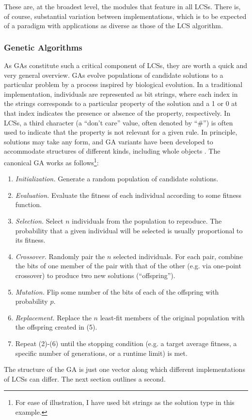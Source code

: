 \documentclass[11pt]{article}
\begin{document}
These are, at the broadest level, the modules that feature in all LCSs. There is, of course, substantial variation between implementations, which is to be expected of a paradigm with applications as diverse as those of the LCS algorithm.

\subsubsection{Genetic Algorithms}

As GAs constitute such a critical component of LCSs, they are worth a quick and very general overview. GAs evolve populations of candidate solutions to a particular problem by a process inspired by biological evolution. In a traditional implementation, individuals are represented as bit strings, where each index in the strings corresponds to a particular property of the solution and a 1 or 0 at that index indicates the presence or absence of the property, respectively. In LCSs, a third character (a ``don't care'' value, often denoted by ``\#'') is often used to indicate that the property is not relevant for a given rule. In principle, solutions may take any form, and GA variants have been developed to accommodate structures of different kinds, including whole objects \cite{keijzer_evolving_2001}. The canonical GA works as follows\footnote{For ease of illustration, I have used bit strings as the solution type in this example.}:
\begin{enumerate}
\item \emph{Initialization.} Generate a random population of candidate solutions.
\item \emph{Evaluation.} Evaluate the fitness of each individual according to some fitness function.
\item \emph{Selection.} Select $n$ individuals from the population to reproduce. The probability that a given individual will be selected is usually proportional to its fitness.
\item \emph{Crossover.} Randomly pair the $n$ selected individuals. For each pair, combine the bits of one member of the pair with that of the other (e.g. via one-point crossover) to produce two new solutions (``offspring'').
\item \emph{Mutation.} Flip some number of the bits of each of the offspring with probability $p$.
\item \emph{Replacement.} Replace the $n$ least-fit members of the original population with the offspring created in (5).
\item Repeat (2)-(6) until the stopping condition (e.g. a target average fitness, a specific number of generations, or a runtime limit) is met.
\end{enumerate}
The structure of the GA is just one vector along which different implementations of LCSs can differ. The next section outlines a second.
\end{document}

